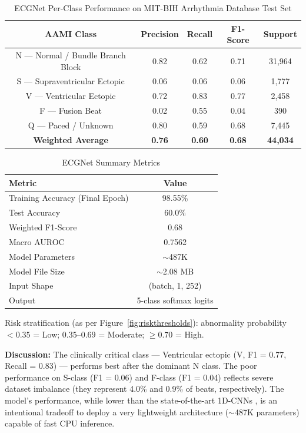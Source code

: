 \begin{table}[h!]
\centering
\caption[ECGNet Per-Class Performance]{ECGNet Per-Class Performance on MIT-BIH Arrhythmia Database Test Set}
\renewcommand{\arraystretch}{1.3}
\begin{tabular}{|c|c|c|c|c|}
\hline
\textbf{AAMI Class} & \textbf{Precision} & \textbf{Recall} & \textbf{F1-Score} & \textbf{Support} \\
\hline
N — Normal / Bundle Branch Block & 0.82 & 0.62 & 0.71 & 31,964 \\
S — Supraventricular Ectopic      & 0.06 & 0.06 & 0.06 & 1,777  \\
V — Ventricular Ectopic           & 0.72 & 0.83 & 0.77 & 2,458  \\
F — Fusion Beat                   & 0.02 & 0.55 & 0.04 & 390    \\
Q — Paced / Unknown               & 0.80 & 0.59 & 0.68 & 7,445  \\
\hline
\textbf{Weighted Average}         & \textbf{0.76} & \textbf{0.60} & \textbf{0.68} & \textbf{44,034} \\
\hline
\end{tabular}
\end{table}

\begin{table}[h!]
\centering
\caption{ECGNet Summary Metrics}
\renewcommand{\arraystretch}{1.3}
\begin{tabular}{|l|c|}
\hline
\textbf{Metric} & \textbf{Value} \\
\hline
Training Accuracy (Final Epoch) & 98.55\% \\
Test Accuracy & 60.0\% \\
Weighted F1-Score & 0.68 \\
Macro AUROC & 0.7562 \\
Model Parameters & $\sim$487K \\
Model File Size & $\sim$2.08 MB \\
Input Shape & (batch, 1, 252) \\
Output & 5-class softmax logits \\
\hline
\end{tabular}
\end{table}

Risk stratification (as per Figure~\ref{fig:riskthresholds}): abnormality probability $< 0.35$ = Low; $0.35$--$0.69$ = Moderate; $\geq 0.70$ = High.

\textbf{Discussion:} The clinically critical class — Ventricular ectopic (V, F1 = 0.77, Recall = 0.83) — performs best after the dominant N class. The poor performance on S-class (F1 = 0.06) and F-class (F1 = 0.04) reflects severe dataset imbalance (they represent 4.0\% and 0.9\% of beats, respectively). The model's performance, while lower than the state-of-the-art 1D-CNNs \cite{guhdar2024, kavitha2024}, is an intentional tradeoff to deploy a very lightweight architecture ($\sim$487K parameters) capable of fast CPU inference.

